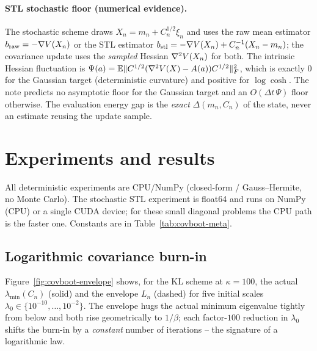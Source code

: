 \documentclass[11pt]{article}
\newcommand{\Delt}{\Delta t}
\newcommand{\lammin}{\lambda_{\min}}
\newcommand{\Psis}{\Psi_\star}
\begin{document}
\paragraph{STL stochastic floor (numerical evidence).}
The stochastic scheme draws $X_n=m_n+C_n^{1/2}\xi_n$ and uses the raw mean
estimator $b_{\mathrm{raw}}=-\nabla V(X_n)$ or the STL estimator
$b_{\mathrm{stl}}=-\nabla V(X_n)+C_n^{-1}(X_n-m_n)$; the covariance update uses the
\emph{sampled} Hessian $\nabla^2 V(X_n)$ for both. The intrinsic Hessian
fluctuation is $\Psi(a)=\mathbb{E}\|C^{1/2}(\nabla^2V(X)-A(a))C^{1/2}\|_F^2$, which is
exactly $0$ for the Gaussian target (deterministic curvature) and positive for
$\log\cosh$. The note predicts no asymptotic floor for the Gaussian target and an
$O(\Delt\,\Psi)$ floor otherwise. The evaluation energy gap is the \emph{exact}
$\Delta(m_n,C_n)$ of the state, never an estimate reusing the update sample.

\section{Experiments and results}
\label{sec:results}

All deterministic experiments are CPU/NumPy (closed-form / Gauss--Hermite, no
Monte Carlo). The stochastic STL experiment is float64 and runs on NumPy (CPU) or
a single CUDA device; for these small diagonal problems the CPU path is the faster
one. Constants are in Table~\ref{tab:covboot-meta}.

\begin{table}[t]
\centering
{}
\caption{Target constants. The Gaussian curvature is $H=\mathrm{diag}$(log-spaced
in $[\alpha,\beta]$), $\kappa=\beta/\alpha$; the $\log\cosh$ target adds
$\gamma\sum_i\log\cosh(x_i)$ (so $\beta=\max h+\gamma$). $\Psis$ is the intrinsic
Hessian-fluctuation intensity at the optimum: exactly zero for the Gaussian
target.}
\label{tab:covboot-meta}
\end{table}

\subsection{Logarithmic covariance burn-in}
\label{sec:scaling}

Figure~\ref{fig:covboot-envelope} shows, for the KL scheme at $\kappa=100$, the
actual $\lammin(C_n)$ (solid) and the envelope $L_n$ (dashed) for five initial
scales $\lambda_0\in\{10^{-10},\dots,10^{-2}\}$. The envelope hugs the actual
minimum eigenvalue tightly from below and both rise geometrically to $1/\beta$;
each factor-$100$ reduction in $\lambda_0$ shifts the burn-in by a \emph{constant}
number of iterations -- the signature of a logarithmic law.
\end{document}
